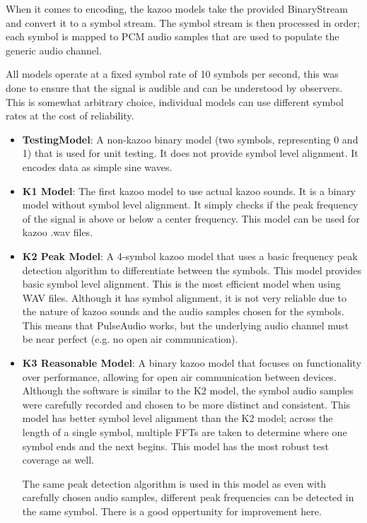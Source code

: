 \documentclass[]{article}
\begin{document}
When it comes to encoding, the kazoo models take the provided BinaryStream and convert it to a symbol stream. The symbol stream is then processed in order; each symbol is mapped to PCM audio samples that are used to populate the generic audio channel.

All models operate at a fixed symbol rate of 10 symbols per second, this was done to ensure that the signal is audible and can be understood by observers. This is somewhat arbitrary choice, individual models can use different symbol rates at the cost of reliability.

\begin{itemize}
  \item \textbf{TestingModel}: A non-kazoo binary model (two symbols, representing 0 and 1) that is used for unit testing. It does not provide symbol level alignment. It encodes data as simple sine waves.

  \item \textbf{K1 Model}: The first kazoo model to use actual kazoo sounds. It is a binary model without symbol level alignment. It simply checks if the peak frequency of the signal is above or below a center frequency. This model can be used for kazoo .wav files.

  \item \textbf{K2 Peak Model}: A 4-symbol kazoo model that uses a basic frequency peak detection algorithm to differentiate between the symbols. This model provides basic symbol level alignment. This is the most efficient model when using WAV files. Although it has symbol alignment, it is not very reliable due to the nature of kazoo sounds and the audio samples chosen for the symbols. This means that PulseAudio works, but the underlying audio channel must be near perfect (e.g. no open air communication).

  \item \textbf{K3 Reasonable Model}: A binary kazoo model that focuses on functionality over performance, allowing for open air communication between devices. Although the software is similar to the K2 model, the symbol audio samples were carefully recorded and chosen to be more distinct and consistent. This model has better symbol level alignment than the K2 model; across the length of a single symbol, multiple FFTs are taken to determine where one symbol ends and the next begins. This model has the most robust test coverage as well.

  The same peak detection algorithm is used in this model as even with carefully chosen audio samples, different peak frequencies can be detected in the same symbol. There is a good oppertunity for improvement here.
\end{itemize}
\end{document}
